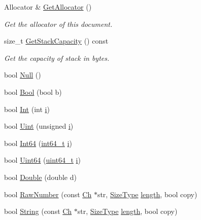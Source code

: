 \begin{DoxyCompactItemize}
Allocator \& \hyperlink{classGenericDocument_aa4609d6b19f86aec1a6b96edf2c27686}{Get\+Allocator} ()
\begin{DoxyCompactList}\small\item\em Get the allocator of this document. \end{DoxyCompactList}\item 
size\+\_\+t \hyperlink{classGenericDocument_a9e2e543c326b8b981d4f2c3d6793d15b}{Get\+Stack\+Capacity} () const
\begin{DoxyCompactList}\small\item\em Get the capacity of stack in bytes. \end{DoxyCompactList}\item 
bool \hyperlink{classGenericDocument_a87dc7f66b2b92660b8a43546733f9df2}{Null} ()
\item 
bool \hyperlink{classGenericDocument_a4c44780642518dd34bd241a1ea0ceaf1}{Bool} (bool b)
\item 
bool \hyperlink{classGenericDocument_a8cc986266becaa268474c607489745c7}{Int} (int \hyperlink{game__play__state_8cpp_acb559820d9ca11295b4500f179ef6392}{i})
\item 
bool \hyperlink{classGenericDocument_a530dd899a04a00ba74f52507b488d2c1}{Uint} (unsigned \hyperlink{game__play__state_8cpp_acb559820d9ca11295b4500f179ef6392}{i})
\item 
bool \hyperlink{classGenericDocument_a934b1b7a7ed89917615a5410db77a942}{Int64} (\hyperlink{stdint_8h_a414156feea104f8f75b4ed9e3121b2f6}{int64\+\_\+t} \hyperlink{game__play__state_8cpp_acb559820d9ca11295b4500f179ef6392}{i})
\item 
bool \hyperlink{classGenericDocument_a50ac3451a1afd0ce248dcc023d5e09e8}{Uint64} (\hyperlink{stdint_8h_aec6fcb673ff035718c238c8c9d544c47}{uint64\+\_\+t} \hyperlink{game__play__state_8cpp_acb559820d9ca11295b4500f179ef6392}{i})
\item 
bool \hyperlink{classGenericDocument_a934bf7a5d1ff062ab079756d842e4f6b}{Double} (double d)
\item 
bool \hyperlink{classGenericDocument_af703994dec5af6ef049a24b5243aceab}{Raw\+Number} (const \hyperlink{classGenericValue_ade0e0ce64ccd5d852da57a35e720bafb}{Ch} $\ast$str, \hyperlink{rapidjson_8h_a5ed6e6e67250fadbd041127e6386dcb5}{Size\+Type} \hyperlink{imgui__impl__opengl3__loader_8h_a011fc24f10426c01349e94a4edd4b0d5}{length}, bool copy)
\item 
bool \hyperlink{classGenericDocument_ad319fcc9e13606b6795424b9374a7398}{String} (const \hyperlink{classGenericValue_ade0e0ce64ccd5d852da57a35e720bafb}{Ch} $\ast$str, \hyperlink{rapidjson_8h_a5ed6e6e67250fadbd041127e6386dcb5}{Size\+Type} \hyperlink{imgui__impl__opengl3__loader_8h_a011fc24f10426c01349e94a4edd4b0d5}{length}, bool copy)

\end{DoxyCompactItemize}
